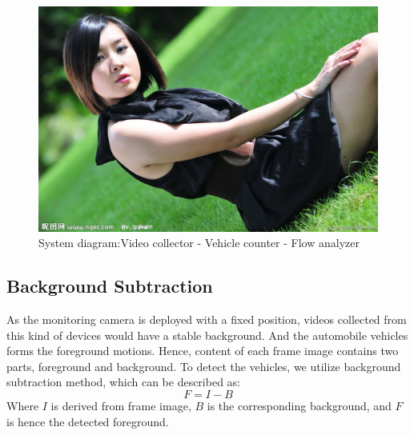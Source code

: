 \documentclass[conference]{IEEEtran}
\begin{document}
	\begin{figure}[!h]
	\centering
	\includegraphics[width=1\linewidth]{figures/lena.jpg} 
	\caption{System diagram:Video collector - Vehicle counter - Flow analyzer}
	\label{fig:sysDiagram}
	\end{figure}
	
	
	\subsection{Background Subtraction}
	As the monitoring camera is deployed with a fixed position, videos collected from this kind of devices would have a stable background. And the automobile vehicles forms the foreground motions. Hence, content of each frame image contains two parts, foreground and background. To detect the vehicles, we utilize background subtraction method, which can be described as:
	\begin{equation}
	F = I  - B
	\label{eq:backgroundSubtraction}
	\end{equation}
	Where $I$ is derived from frame image, $B$ is the corresponding background, and $F$ is hence the detected foreground.
	
\end{document}
